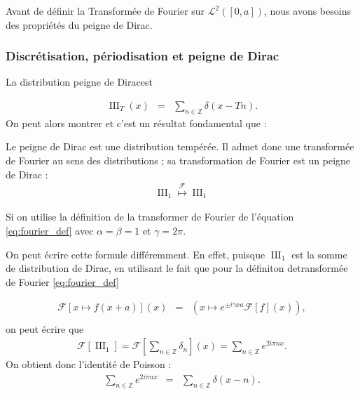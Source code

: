 \medskip 

Avant de définir la \guillemotleft Transformée de Fourier sur $\mathcal L^2([0,a])$\guillemotright, nous avons besoins des propriétés du peigne de Dirac.

\subsubsection{Discrétisation, périodisation et peigne de Dirac}

La distribution \guillemotleft peigne de Dirac\guillemotright  est 

\begin{eqnarray}
    \operatorname{III}_T(x) & = & \sum_{n \in \mathbb Z} \delta ( x - Tn ).
\end{eqnarray}
On peut alors montrer \textendash\textendash{} et c'est un résultat fondamental \textendash\textendash{} que :


\begin{Theo}
    Le peigne de Dirac est une distribution tempérée. Il admet donc une transformée de Fourier au sens des distributions ; sa transformation de Fourier est un peigne de Dirac :
    \begin{eqnarray}
        \operatorname{III}_1 \overset{\mathcal F}{\longmapsto} \operatorname{III}_1
    \end{eqnarray}

    Si on utilise la définition de la transformer de Fourier de l'équation  \eqref{eq:fourier_def} avec $\alpha = \beta = 1 $ et $\gamma = 2\pi$.

    \smallskip 

    On peut écrire cette formule différemment. En effet, puisque $\operatorname{III}_1$ est la somme de distribution de Dirac, en utilisant le fait que pour la définiton detransformée de Fourier \eqref{eq:fourier_def}

    \begin{eqnarray}
        \mathcal F [ x \mapsto f(x + a)](x)  & = &   \left ( x \mapsto  e^{\pm i \gamma x a}  \mathcal F [f](x) \right  ) ,\\
    \end{eqnarray}
    on peut écrire que 
    \begin{eqnarray}
        \mathcal F [\operatorname{III}_1]  =  \mathcal F \left [\sum_{n \in \mathbb Z} \delta_n \right ](x) = \sum_{n \in \mathbb Z } e^{2i\pi n x }.
    \end{eqnarray}
    On obtient donc l'identité de Poisson :
    \begin{eqnarray}
        \sum_{n \in \mathbb Z } e^{2i\pi n x }& = & \sum_{n \in \mathbb Z} \delta ( x - n).
    \end{eqnarray}

\end{Theo}


